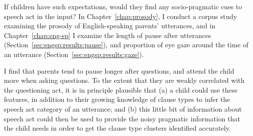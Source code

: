 If children have such expectations, would they find any socio-pragmatic cues to speech act in the input? In Chapter~\ref{chap:prosody}, 
I conduct a corpus study examining the prosody of English-speaking parents' utterances, and in Chapter~\ref{chap:eng-sp} I examine the length of pause after utterances (Section~\ref{sec:engsp:results:pause}), and proportion of eye gaze around the time of an utterance (Section~\ref{sec:engsp:results:gaze}). 


I find that parents tend to pause longer after questions, and attend the child more when asking questions. To the extent that they are weakly correlated with the questioning act, it is in principle plausible that (a) a child could use these features, in addition to their growing knowledge of clause types to infer the speech act category of an utterance; and (b) this little bit of information about speech act could then be used to provide the noisy pragmatic information that the child needs in order to get the clause type clusters identified accurately.

 
